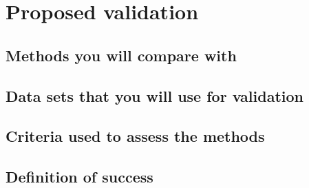 \section{Proposed validation}
\subsection{Methods you will compare with}
\subsection{Data sets that you will use for validation}
\subsection{Criteria used to assess the methods}
\subsection{Definition of success}

